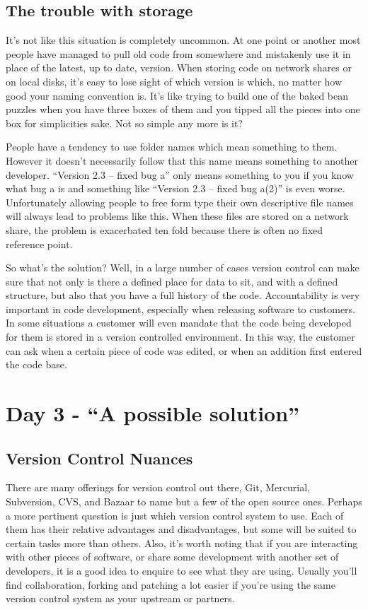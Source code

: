 \subsection{The trouble with storage}

It's not like this situation is completely uncommon.
At one point or another most people have managed to pull old code from somewhere and mistakenly use it in place of the latest, up to date, version.
When storing code on network shares or on local disks, it's easy to lose sight of which version is which, no matter how good your naming convention is.
It's like trying to build one of the baked bean puzzles when you have three boxes of them and you tipped all the pieces into one box for simplicities sake.
Not so simple any more is it?

People have a tendency to use folder names which mean something to them.
However it doesn't necessarily follow that this name means something to another developer.
``Version 2.3 -- fixed bug a'' only means something to you if you know what bug a is and something like ``Version 2.3 -- fixed bug a(2)'' is even worse.
Unfortunately allowing people to free form type their own descriptive file names will always lead to problems like this.
When these files are stored on a network share, the problem is exacerbated ten fold because there is often no fixed reference point.

So what's the solution? Well, in a large number of cases version control can make sure that not only is there a defined place for data to sit, and with a defined structure, but also that you have a full history of the code.
Accountability is very important in code development, especially when releasing software to customers.
In some situations a customer will even mandate that the code being developed for them is stored in a version controlled environment.
In this way, the customer can ask when a certain piece of code was edited, or when an addition first entered the code base.

\section{Day 3 - ``A possible solution''}
\subsection{Version Control Nuances}

There are many offerings for version control out there, Git, Mercurial, Subversion, CVS, and Bazaar to name but a few of the open source ones.
Perhaps a more pertinent question is just which version control system to use.
Each of them has their relative advantages and disadvantages, but some will be suited to certain tasks more than others.
Also, it's worth noting that if you are interacting with other pieces of software, or share some development with another set of developers, it is a good idea to enquire to see what they are using.
Usually you'll find collaboration, forking and patching a lot easier if you're using the same version control system as your upstream or partners.

